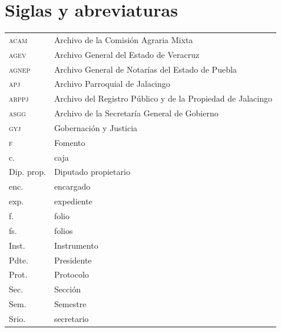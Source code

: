 \documentclass[14pt,twoside,final]{extbook} %
\begin{document}
\chapter*{Siglas y abreviaturas}
\label{ch:siglas-y-abreviaturas}
\pagestyle{empty}
\thispagestyle{empty}
\pagestyle{fancy}
\fancyhf{} %
\fancyhead[RO,LE]{\thepage}
\renewcommand{\headrulewidth}{0pt}
\begin{table}[H]
\centering
\begin{tabular}{@{}ll@{}}
\textsc{acam} & Archivo de la Comisión Agraria Mixta \\
\textsc{agev} & Archivo General del Estado de Veracruz \\
\textsc{agnep} & Archivo General de Notarías del Estado de Puebla \\
\textsc{apj} & Archivo Parroquial de Jalacingo \\
\textsc{arppj} & Archivo del Registro Público y de la Propiedad de Jalacingo \\
\textsc{asgg} & Archivo de la Secretaría General de Gobierno \\
\textsc{gyj} & Gobernación y Justicia \\
\textsc{f} & Fomento \\
c. & caja \\
Dip. prop. & Diputado propietario \\
enc. & encargado \\
exp. & expediente \\
f. & folio \\
fs. & folios \\
Inst. & Instrumento \\
Pdte. & Presidente \\
Prot. & Protocolo \\
Sec. & Sección \\
Sem. & Semestre \\
Srio. & secretario \\
\end{tabular}
\label{tab:siglas-y-abreviaturas}
\end{table}
\end{document}
